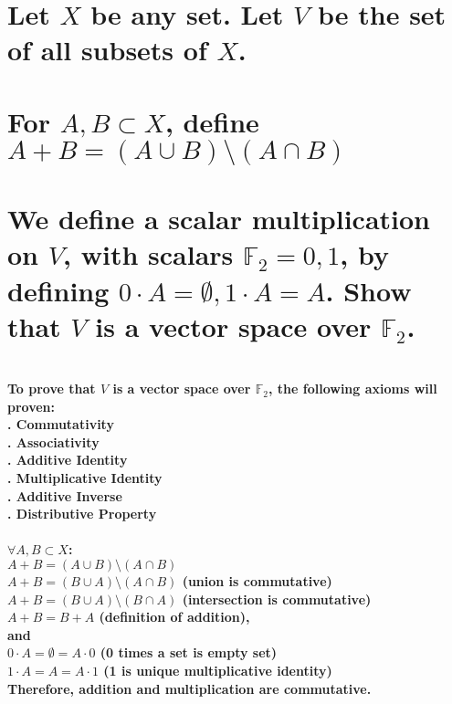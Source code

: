 \documentclass{article}
\begin{document}
\newpage

\section{Let \(X\) be any set. Let \(V\) be the set of all subsets of \(X\).\\\\For \(A, B \subset X\), define \(A + B = (A \cup B) \setminus (A \cap B)\)\\\\We define a scalar multiplication on \(V\), with scalars \(\mathds{F}_{2} = {0, 1}\), by defining \(0 \cdot A = \emptyset, 1 \cdot A = A\). Show that \(V\) is a vector space over \(\mathds{F}_{2}\).}

\paragraph{\large
\\To prove that \(V\) is a vector space over \(\mathds{F}_{2}\), the following axioms will proven:
\\. Commutativity
\\. Associativity
\\. Additive Identity
\\. Multiplicative Identity
\\. Additive Inverse
\\. Distributive Property}

\paragraph{\large
\(\forall A, B \subset X\):
\\\indent \(A + B = (A \cup B) \setminus (A \cap B)\)
\\\indent \(A + B = (B \cup A) \setminus (A \cap B)\) (union is commutative)
\\\indent \(A + B = (B \cup A) \setminus (B \cap A)\) (intersection is commutative)
\\\indent \(A + B = B + A\) (definition of addition),
\\and
\\\indent \(0 \cdot A = \emptyset = A \cdot 0\) (0 times a set is empty set)
\\\indent \(1 \cdot A = A = A \cdot 1\) (1 is unique multiplicative identity)
\\ Therefore, addition and multiplication are commutative.}
\end{document}
